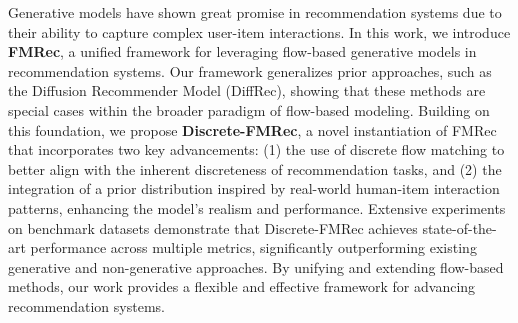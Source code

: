 Generative models have shown great promise in recommendation systems due to their ability to capture complex user-item interactions. In this work, we introduce \textbf{FMRec}, a unified framework for leveraging flow-based generative models in recommendation systems. Our framework generalizes prior approaches, such as the Diffusion Recommender Model (DiffRec), showing that these methods are special cases within the broader paradigm of flow-based modeling. Building on this foundation, we propose \textbf{Discrete-FMRec}, a novel instantiation of FMRec that incorporates two key advancements: (1) the use of discrete flow matching to better align with the inherent discreteness of recommendation tasks, and (2) the integration of a prior distribution inspired by real-world human-item interaction patterns, enhancing the model's realism and performance. Extensive experiments on benchmark datasets demonstrate that Discrete-FMRec achieves state-of-the-art performance across multiple metrics, significantly outperforming existing generative and non-generative approaches. By unifying and extending flow-based methods, our work provides a flexible and effective framework for advancing recommendation systems.
